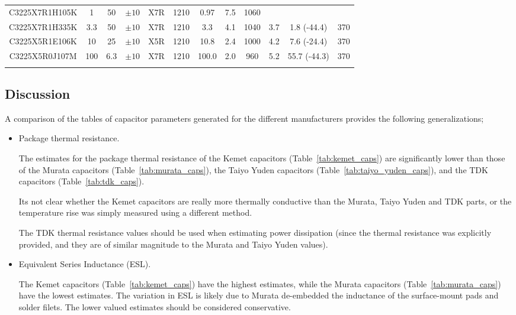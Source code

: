 \documentclass[10pt,twoside]{article}
\begin{document}
\begin{landscape}
\begin{table}[p]
\begin{center}
\begin{tabular}{|c|c|c|c|c|c||c|c|c|c||c||c|}
C3225X7R1H105K &   1 &  50 & $\pm10$ & X7R & 1210 &  0.97 & 7.5 & 1060 &     &              & \\
C3225X7R1H335K & 3.3 &  50 & $\pm10$ & X7R & 1210 &   3.3 & 4.1 & 1040 & 3.7 &  1.8 (-44.4) & 370 \\
C3225X5R1E106K &  10 &  25 & $\pm10$ & X5R & 1210 &  10.8 & 2.4 & 1000 & 4.2 &  7.6 (-24.4) & 370\\
C3225X5R0J107M & 100 & 6.3 & $\pm10$ & X7R & 1210 & 100.0 & 2.0 &  960 & 5.2 & 55.7 (-44.3) & 370 \\
&&&&&&&&&&&\\
\hline
\end{tabular}
\end{center}
\end{table}
\end{landscape}

\clearpage
\subsection{Discussion}

A comparison of the tables of capacitor parameters generated for
the different manufacturers provides the following generalizations;
%
\begin{itemize}
%
\item Package thermal resistance.

The estimates for the package thermal resistance of the Kemet capacitors
(Table~\ref{tab:kemet_caps}) are significantly lower than those
of the Murata capacitors (Table~\ref{tab:murata_caps}), the
Taiyo Yuden capacitors (Table~\ref{tab:taiyo_yuden_caps}), and
the TDK capacitors (Table~\ref{tab:tdk_caps}).

Its not clear whether the Kemet capacitors are really more thermally 
conductive than the Murata, Taiyo Yuden and TDK parts, or the temperature
rise was simply measured using a different method.

The TDK thermal resistance values should be used when estimating
power dissipation (since the thermal resistance was explicitly provided,
and they are of similar magnitude to the Murata and Taiyo Yuden values).

\item Equivalent Series Inductance (ESL).

The Kemet capacitors (Table~\ref{tab:kemet_caps}) have the highest
estimates, while the Murata capacitors (Table~\ref{tab:murata_caps})
have the lowest estimates.
%
The variation in ESL is likely due to Murata de-embedded the inductance
of the surface-mount pads and solder filets. The lower valued
estimates should be considered conservative.
\end{itemize}
%
\end{document}

